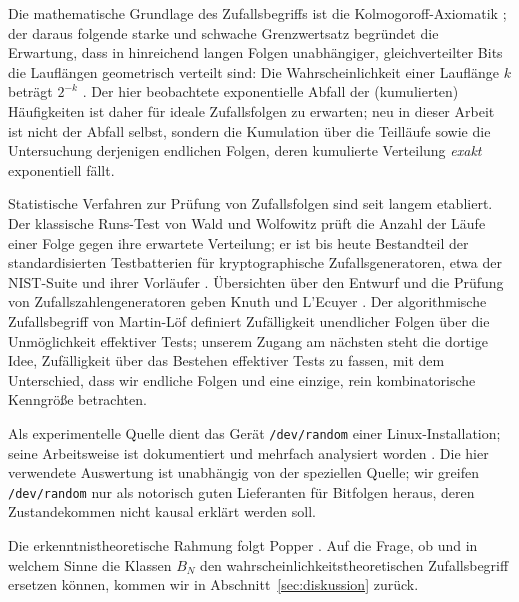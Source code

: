 \documentclass[11pt,a4paper]{scrartcl}
\theoremstyle{plain}
\theoremstyle{definition}
\theoremstyle{remark}
\begin{document}
Die mathematische Grundlage des Zufallsbegriffs ist die
Kolmogoroff-Axiomatik \cite{kolmogoroff1933}; der daraus folgende
starke und schwache Grenzwertsatz begründet die Erwartung, dass in
hinreichend langen Folgen unabhängiger, gleichverteilter Bits die
Lauflängen geometrisch verteilt sind: Die Wahrscheinlichkeit einer
Lauflänge $k$ beträgt $2^{-k}$ \cite[und dortige Übungsaufgaben zu Runs]{feller1968}.
Der hier beobachtete exponentielle Abfall der (kumulierten)
Häufigkeiten ist daher für ideale Zufallsfolgen zu erwarten; neu in
dieser Arbeit ist nicht der Abfall selbst, sondern die Kumulation über
die Teilläufe sowie die Untersuchung derjenigen endlichen Folgen, deren
kumulierte Verteilung \emph{exakt} exponentiell fällt.

Statistische Verfahren zur Prüfung von Zufallsfolgen sind seit langem
etabliert. Der klassische Runs-Test von Wald und Wolfowitz
\cite{waldwolfowitz1940} prüft die Anzahl der Läufe einer Folge gegen
ihre erwartete Verteilung; er ist bis heute Bestandteil der
standardisierten Testbatterien für kryptographische Zufallsgeneratoren,
etwa der NIST-Suite \cite{rukhin2010nist} und ihrer Vorläufer
\cite{knuth1997,marsaglia1996}. Übersichten über den Entwurf und die
Prüfung von Zufallszahlengeneratoren geben Knuth \cite{knuth1997} und
L'Ecuyer \cite{lecuyer1994}. Der algorithmische Zufallsbegriff von
Martin-Löf \cite{martinloef1966} definiert Zufälligkeit unendlicher
Folgen über die Unmöglichkeit effektiver Tests; unserem Zugang am
nächsten steht die dortige Idee, Zufälligkeit über das Bestehen
effektiver Tests zu fassen, mit dem Unterschied, dass wir endliche
Folgen und eine einzige, rein kombinatorische Kenngröße betrachten.

Als experimentelle Quelle dient das Gerät \texttt{/dev/random} einer
Linux-Installation; seine Arbeitsweise ist dokumentiert und mehrfach
analysiert worden \cite{gutterman2004}. Die hier verwendete
Auswertung ist unabhängig von der speziellen Quelle; wir greifen
\texttt{/dev/random} nur als notorisch guten Lieferanten für Bitfolgen
heraus, deren Zustandekommen nicht kausal erklärt werden soll.

Die erkenntnistheoretische Rahmung folgt Popper \cite{popper1935}.
Auf die Frage, ob und in welchem Sinne die Klassen $B_N$ den
wahrscheinlichkeitstheoretischen Zufallsbegriff ersetzen können, kommen
wir in Abschnitt~\ref{sec:diskussion} zurück.

\end{document}
